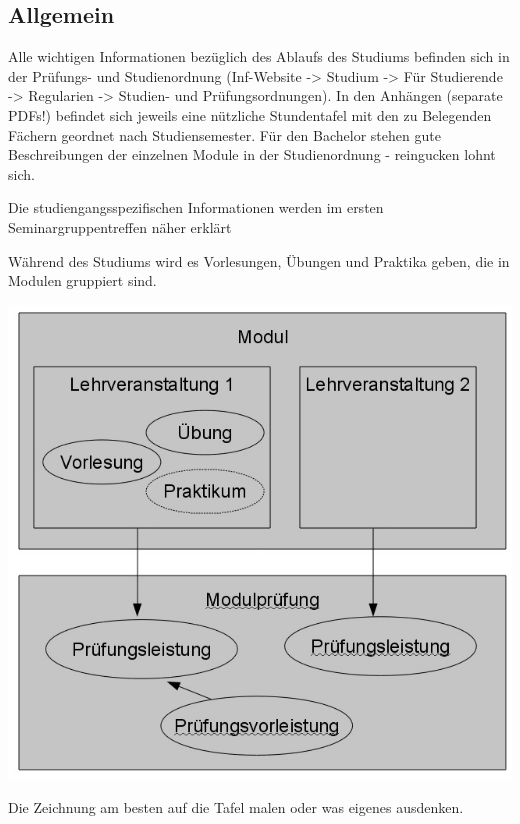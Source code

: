 \documentclass[a4paper,12pt]{report}
\begin{document}
\subsection{Allgemein}
\begin{itemize*}
	\item Alle wichtigen Informationen bezüglich des Ablaufs des Studiums befinden sich in der Prüfungs- und Studienordnung (Inf-Website -> Studium -> Für Studierende -> Regularien -> Studien- und Prüfungsordnungen).
	In den Anhängen (separate PDFs!) befindet sich jeweils eine nützliche Stundentafel mit den zu Belegenden Fächern geordnet nach Studiensemester.
	Für den Bachelor stehen gute Beschreibungen der einzelnen Module in der Studienordnung - reingucken lohnt sich.
	\item Die studiengangsspezifischen Informationen werden im ersten Seminargruppentreffen näher erklärt
	\item Während des Studiums wird es Vorlesungen, Übungen und Praktika geben, die in Modulen gruppiert sind.

	\includegraphics[width=14cm]{modul.jpg}
	\begin{center}
	Die Zeichnung am besten auf die Tafel malen oder was eigenes ausdenken.
	\end{center}


\end{itemize*}
\end{document}
